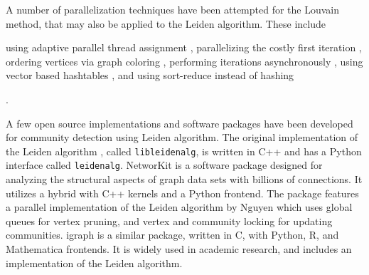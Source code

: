A number of parallelization techniques have been attempted for the Louvain method, that may also be applied to the Leiden algorithm. These include using adaptive parallel thread assignment \cite{com-fazlali17, com-naim17, com-sattar19, com-mohammadi20}, parallelizing the costly first iteration \cite{com-wickramaarachchi14}, ordering vertices via graph coloring \cite{com-halappanavar17}, performing iterations asynchronously \cite{com-que15, com-shi21}, using vector based hashtables \cite{com-halappanavar17}, and using sort-reduce instead of hashing \cite{com-cheong13}.

A few open source implementations and software packages have been developed for community detection using Leiden algorithm. The original implementation of the Leiden algorithm \cite{com-traag19}, called \texttt{libleidenalg}, is written in C++ and has a Python interface called \texttt{leidenalg}. NetworKit \cite{staudt2016networkit} is a software package designed for analyzing the structural aspects of graph data sets with billions of connections. It utilizes a hybrid with C++ kernels and a Python frontend. The package features a parallel implementation of the Leiden algorithm by Nguyen \cite{nguyenleiden} which uses global queues for vertex pruning, and vertex and community locking for updating communities. igraph \cite{csardi2006igraph} is a similar package, written in C, with Python, R, and Mathematica frontends. It is widely used in academic research, and includes an implementation of the Leiden algorithm.
